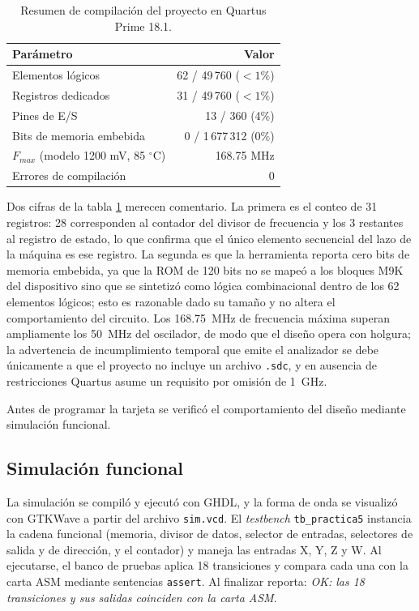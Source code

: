 \begin{table}[H]
  \centering
  \caption{Resumen de compilación del proyecto en Quartus Prime 18.1.}
  \label{tab:sintesis}
  \begin{tabular}{@{}l r@{}}
    \toprule
    \textbf{Parámetro} & \textbf{Valor} \\
    \midrule
    Elementos lógicos            & 62 / 49\,760 ($<1\%$) \\
    Registros dedicados          & 31 / 49\,760 ($<1\%$) \\
    Pines de E/S                 & 13 / 360 (4\%) \\
    Bits de memoria embebida     & 0 / 1\,677\,312 (0\%) \\
    $F_{max}$ (modelo 1200 mV, 85 $^\circ$C) & 168.75 MHz \\
    Errores de compilación       & 0 \\
    \bottomrule
  \end{tabular}
\end{table}

Dos cifras de la tabla \ref{tab:sintesis} merecen comentario. La primera es el conteo de 31
registros: 28 corresponden al contador del divisor de frecuencia y los 3 restantes al registro de
estado, lo que confirma que el único elemento secuencial del lazo de la máquina es ese registro.
La segunda es que la herramienta reporta cero bits de memoria embebida, ya que la ROM de 120 bits
no se mapeó a los bloques M9K del dispositivo sino que se sintetizó como lógica combinacional
dentro de los 62 elementos lógicos; esto es razonable dado su tamaño y no altera el comportamiento
del circuito. Los 168.75~MHz de frecuencia máxima superan ampliamente los 50~MHz del oscilador, de
modo que el diseño opera con holgura; la advertencia de incumplimiento temporal que emite el
analizador se debe únicamente a que el proyecto no incluye un archivo \texttt{.sdc}, y en ausencia
de restricciones Quartus asume un requisito por omisión de 1~GHz.

Antes de programar la tarjeta se verificó el comportamiento del diseño mediante simulación
funcional.

\subsection{Simulación funcional}

La simulación se compiló y ejecutó con GHDL, y la forma de onda se visualizó con GTKWave a partir del
archivo \texttt{sim.vcd}. El \textit{testbench} \texttt{tb\_practica5} instancia la cadena funcional
(memoria, divisor de datos, selector de entradas, selectores de salida y de dirección, y el contador)
y maneja las entradas X, Y, Z y W. Al ejecutarse, el banco de pruebas aplica 18 transiciones y compara
cada una con la carta ASM mediante sentencias \texttt{assert}. Al finalizar reporta: \textit{OK: las
18 transiciones y sus salidas coinciden con la carta ASM}.


